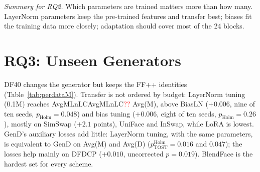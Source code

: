 \documentclass[fonts]{icst}
\newcommand{\num}[1]{\ifcsname #1\endcsname\csname #1\endcsname\else\textcolor{red}{??}\fi}
\begin{document}
\textit{Summary for RQ2.} Which parameters are trained matters more than how many. LayerNorm parameters keep the pre-trained features and transfer best; biases fit the training data more closely; adaptation should cover most of the 24 blocks.

\section{RQ3: Unseen Generators}
\label{sec:rq3}


DF40 changes the generator but keeps the FF++ identities (Table~\ref{tab:perdataM}). Transfer is not ordered by budget: LayerNorm tuning (0.1M) reaches \num{AvgMLnLC} Avg(M), above BiasLN ($+0.006$, nine of ten seeds, $p_{\mathrm{Holm}}=0.048$) and bias tuning ($+0.006$, eight of ten seeds, $p_{\mathrm{Holm}}=0.26$), mostly on SimSwap ($+2.1$ points), UniFace and InSwap, while LoRA is lowest. GenD's auxiliary losses add little: LayerNorm tuning, with the same parameters, is equivalent to GenD on Avg(M) and Avg(D) ($p^{\mathrm{Holm}}_{\mathrm{TOST}}=0.016$ and $0.047$); the losses help mainly on DFDCP ($+0.010$, uncorrected $p=0.019$). BlendFace is the hardest set for every scheme.

\begin{table}[!htb]
\centering
\caption{Measured cost on an NVIDIA A100-40GB (fp32, $224\times224$). Train: batch 32, forward + backward + Adam step. Infer: batch 1. Ckpt: size of the stored trainable tensors.}
\label{tab:cost}
\end{table}
\end{document}
